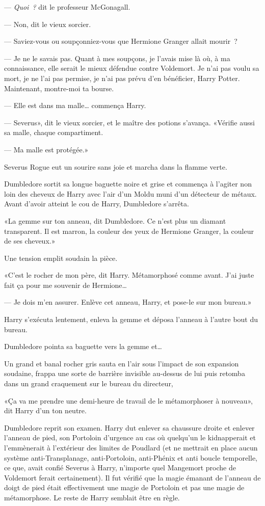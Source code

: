 --- \emph{Quoi~?} dit le professeur McGonagall.

--- Non, dit le vieux sorcier.

--- Saviez-vous ou soupçonniez-vous que Hermione Granger allait mourir~?

--- Je ne le savais pas. Quant à mes soupçons, je l'avais mise là où, à ma connaissance, elle serait le mieux défendue contre Voldemort. Je n'ai pas voulu sa mort, je ne l'ai pas permise, je n'ai pas prévu d'en bénéficier, Harry Potter. Maintenant, montre-moi ta bourse.

--- Elle est dans ma malle… commença Harry.

--- Severus», dit le vieux sorcier, et le maître des potions s'avança. «Vérifie aussi sa malle, chaque compartiment.

--- Ma malle est protégée.»

Severus Rogue eut un sourire sans joie et marcha dans la flamme verte.

Dumbledore sortit sa longue baguette noire et grise et commença à l'agiter non loin des cheveux de Harry avec l'air d'un Moldu muni d'un détecteur de métaux. Avant d'avoir atteint le cou de Harry, Dumbledore s'arrêta.

«La gemme sur ton anneau, dit Dumbledore. Ce n'est plus un diamant transparent. Il est marron, la couleur des yeux de Hermione Granger, la couleur de ses cheveux.»

Une tension emplit soudain la pièce.

«C'est le rocher de mon père, dit Harry. Métamorphosé comme avant. J'ai juste fait ça pour me souvenir de Hermione…

--- Je dois m'en assurer. Enlève cet anneau, Harry, et pose-le sur mon bureau.»

Harry s'exécuta lentement, enleva la gemme et déposa l'anneau à l'autre bout du bureau.

Dumbledore pointa sa baguette vers la gemme et…

Un grand et banal rocher gris sauta en l'air sous l'impact de son expansion soudaine, frappa une sorte de barrière invisible au-dessus de lui puis retomba dans un grand craquement sur le bureau du directeur,

«Ça va me prendre une demi-heure de travail de le métamorphoser à nouveau», dit Harry d'un ton neutre.

Dumbledore reprit son examen. Harry dut enlever sa chaussure droite et enlever l'anneau de pied, son Portoloin d'urgence au cas où quelqu'un le kidnapperait et l'emmènerait à l'extérieur des limites de Poudlard (et ne mettrait en place aucun système anti-Transplanage, anti-Portoloin, anti-Phénix et anti boucle temporelle, ce que, avait confié Severus à Harry, n'importe quel Mangemort proche de Voldemort ferait certainement). Il fut vérifié que la magie émanant de l'anneau de doigt de pied était effectivement une magie de Portoloin et pas une magie de métamorphose. Le reste de Harry semblait être en règle.

